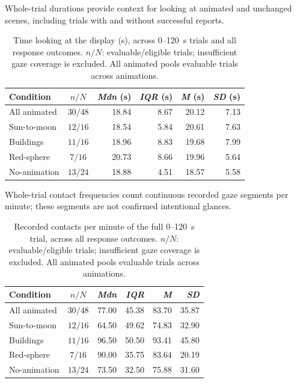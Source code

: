 \documentclass[
english,                 %
bibtex,                  %
includeExtraAbstracts, %
]{kththesis}
\newenvironment{evidenceblock}{\par\addvspace{6pt}\noindent\begin{minipage}{\linewidth}}{\end{minipage}\par\addvspace{6pt}}
\numberwithin{listing}{chapter}
\begin{document}
\begin{evidenceblock}
\normalsize
Whole-trial durations provide context for looking at animated and unchanged scenes, including trials with and without successful reports.

\begin{table}[H]
\centering\scriptsize
\caption[Whole-trial time looking at the display]{Time looking at the display (s), across 0--120~s trials and all response outcomes. $n/N$: evaluable/eligible trials; insufficient gaze coverage is excluded. All animated pools evaluable trials across animations.}
\label{tab:gaze-whole-trial-time}
\setlength{\tabcolsep}{4pt}
\begin{tabularx}{\textwidth}{@{}X c r r r r@{}}
\toprule
Condition & $n/N$ & \textit{Mdn} (s) & \textit{IQR} (s) & \textit{M} (s) & \textit{SD} (s) \\
\midrule
All animated & $30/48$ & 18.84 & 8.67 & 20.12 & 7.13 \\
Sun-to-moon & $12/16$ & 18.54 & 5.84 & 20.61 & 7.63 \\
Buildings & $11/16$ & 18.96 & 8.83 & 19.68 & 7.99 \\
Red-sphere & $7/16$ & 20.73 & 8.66 & 19.96 & 5.64 \\
No-animation & $13/24$ & 18.88 & 4.51 & 18.57 & 5.58 \\
\bottomrule
\end{tabularx}
\end{table}
\end{evidenceblock}

\begin{evidenceblock}
\normalsize
Whole-trial contact frequencies count continuous recorded gaze segments per minute; these segments are not confirmed intentional glances.

\begin{table}[H]
\centering\scriptsize
\caption[Whole-trial display contact frequency]{Recorded contacts per minute of the full 0--120~s trial, across all response outcomes. $n/N$: evaluable/eligible trials; insufficient gaze coverage is excluded. All animated pools evaluable trials across animations.}
\label{tab:gaze-whole-trial-frequency}
\setlength{\tabcolsep}{4pt}
\begin{tabularx}{\textwidth}{@{}X c r r r r@{}}
\toprule
Condition & $n/N$ & \textit{Mdn} & \textit{IQR} & \textit{M} & \textit{SD} \\
\midrule
All animated & $30/48$ & 77.00 & 45.38 & 83.70 & 35.87 \\
Sun-to-moon & $12/16$ & 64.50 & 49.62 & 74.83 & 32.90 \\
Buildings & $11/16$ & 96.50 & 50.50 & 93.41 & 45.80 \\
Red-sphere & $7/16$ & 90.00 & 35.75 & 83.64 & 20.19 \\
No-animation & $13/24$ & 73.50 & 32.50 & 75.88 & 31.60 \\
\bottomrule
\end{tabularx}
\end{table}
\end{evidenceblock}
\end{document}
